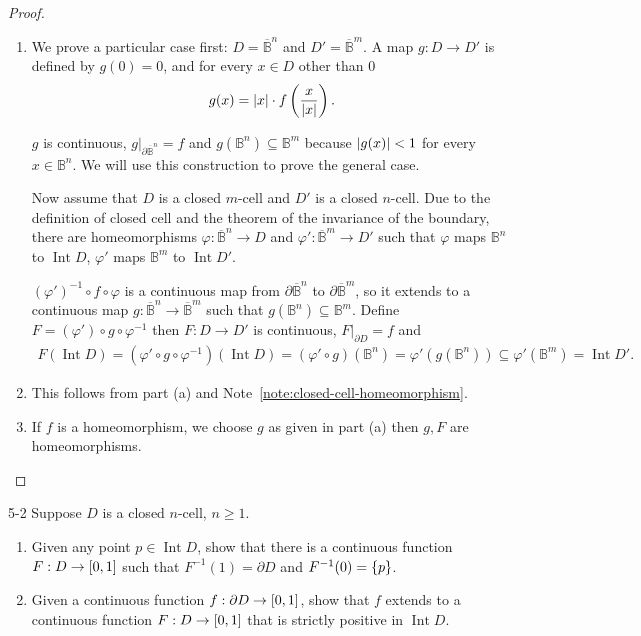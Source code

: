 \begin{proof}
	\begin{enumerate}[label={(\alph*)}]
		\item We prove a particular case first: $D = \overline{\mathbb{B}}^{n}$ and $D' = \overline{\mathbb{B}}^{m}$. A map $g: D\to D'$ is defined by $g(0) = 0$, and for every $x \in D$ other than 0
		      \begin{align*}
			      g(x) = \left\vert{x}\right\vert\cdot f\left(\frac{x}{\left\vert{x}\right\vert}\right).
		      \end{align*}

		      $g$ is continuous, $g\vert_{\partial \overline{\mathbb{B}}^{n}} = f$ and $g(\mathbb{B}^{n}) \subseteq \mathbb{B}^{m}$ because $\left\vert{g(x)}\right\vert < 1$ for every $x \in \mathbb{B}^{n}$. We will use this construction to prove the general case.

		      Now assume that $D$ is a closed $m$-cell and $D'$ is a closed $n$-cell. Due to the definition of closed cell and the theorem of the invariance of the boundary, there are homeomorphisms $\varphi: \overline{\mathbb{B}}^{n} \to D$ and $\varphi': \overline{\mathbb{B}}^{m} \to D'$ such that $\varphi$ maps $\mathbb{B}^{n}$ to $\operatorname{Int} D$, $\varphi'$ maps $\mathbb{B}^{m}$ to $\operatorname{Int} D'$.

		      ${(\varphi')}^{-1}\circ f\circ \varphi$ is a continuous map from $\partial \overline{\mathbb{B}}^{n}$ to $\partial \overline{\mathbb{B}}^{m}$, so it extends to a continuous map $g: \overline{\mathbb{B}}^{n} \to \overline{\mathbb{B}}^{m}$ such that $g(\mathbb{B}^{n}) \subseteq \mathbb{B}^{m}$. Define $F = {(\varphi')}\circ g\circ \varphi^{-1}$ then $F: D \to D'$ is continuous, $F\vert_{\partial D} = f$ and
		      \begin{align*}
			      F(\operatorname{Int} D) = (\varphi'\circ g\circ \varphi^{-1})(\operatorname{Int} D) = {(\varphi' \circ g)}(\mathbb{B}^{n}) = \varphi'(g(\mathbb{B}^{n})) \subseteq \varphi'(\mathbb{B}^{m}) = \operatorname{Int} D'.
		      \end{align*}
		\item This follows from part (a) and Note~\ref{note:closed-cell-homeomorphism}.
		\item If $f$ is a homeomorphism, we choose $g$ as given in part (a) then $g, F$ are homeomorphisms.
	\end{enumerate}
\end{proof}

\begin{problem}{5-2}\label{problem:5-2}
Suppose $D$ is a closed $n$-cell, $n\geq 1$.
\begin{enumerate}[label={(\alph*)}]
	\item Given any point $p\in \operatorname{Int} D$, show that there is a continuous function $F: D \to \left[{0, 1}\right]$ such that $F^{-1}(1) = \partial D$ and $F^{-1}(0) = \left\{{p}\right\}$.
	\item Given a continuous function $f: \partial D \to \left[{0, 1}\right]$, show that $f$ extends to a continuous function $F: D \to \left[{0, 1}\right]$ that is strictly positive in $\operatorname{Int} D$.
\end{enumerate}
\end{problem}

